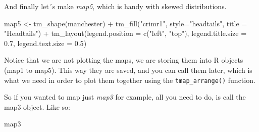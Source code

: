 \documentclass[
]{book}
\makeatletter
\newenvironment{Shaded}{\begin{snugshade}}{\end{snugshade}}
\newcommand{\AttributeTok}[1]{\textcolor[rgb]{0.61,0.61,0.61}{#1}}
\newcommand{\FloatTok}[1]{\textcolor[rgb]{0.06,0.06,0.06}{#1}}
\newcommand{\FunctionTok}[1]{\textcolor[rgb]{0,0,0}{#1}}
\newcommand{\NormalTok}[1]{#1}
\newcommand{\OtherTok}[1]{\textcolor[rgb]{0.37,0.37,0.37}{#1}}
\newcommand{\SpecialCharTok}[1]{\textcolor[rgb]{0,0,0}{#1}}
\newcommand{\StringTok}[1]{\textcolor[rgb]{0.5,0.5,0.5}{#1}}
\newenvironment{kframe}{%
\medskip{}
\setlength{\fboxsep}{.8em}
 \def\at@end@of@kframe{}%
 \ifinner\ifhmode%
  \def\at@end@of@kframe{\end{minipage}}%
  \begin{minipage}{\columnwidth}%
 \fi\fi%
 \def\FrameCommand##1{\hskip\@totalleftmargin \hskip-\fboxsep
 \colorbox{shadecolor}{##1}\hskip-\fboxsep
     \hskip-\linewidth \hskip-\@totalleftmargin \hskip\columnwidth}%
 \MakeFramed {\advance\hsize-\width
   \@totalleftmargin\z@ \linewidth\hsize
   \@setminipage}}%
 {\par\unskip\endMakeFramed%
 \at@end@of@kframe}
\renewenvironment{Shaded}{\begin{kframe}}{\end{kframe}}
\makeatother
\begin{document}
And finally let´s make \emph{map5}, which is handy with skewed distributions.

\begin{Shaded}
\begin{Highlighting}[]
\NormalTok{map5 }\OtherTok{\textless{}{-}} \FunctionTok{tm\_shape}\NormalTok{(manchester) }\SpecialCharTok{+} 
  \FunctionTok{tm\_fill}\NormalTok{(}\StringTok{"crimr1"}\NormalTok{, }\AttributeTok{style=}\StringTok{"headtails"}\NormalTok{, }\AttributeTok{title =} \StringTok{"Headtails"}\NormalTok{) }\SpecialCharTok{+}
  \FunctionTok{tm\_layout}\NormalTok{(}\AttributeTok{legend.position =} \FunctionTok{c}\NormalTok{(}\StringTok{"left"}\NormalTok{, }\StringTok{"top"}\NormalTok{), }
            \AttributeTok{legend.title.size =} \FloatTok{0.7}\NormalTok{,}
            \AttributeTok{legend.text.size =} \FloatTok{0.5}\NormalTok{)}
\end{Highlighting}
\end{Shaded}

Notice that we are not plotting the maps, we are storing them into R objects (map1 to map5). This way they are saved, and you can call them later, which is what we need in order to plot them together using the \texttt{tmap\_arrange()} function.

So if you wanted to map just \emph{map3} for example, all you need to do, is call the map3 object. Like so:

\begin{Shaded}
\begin{Highlighting}[]
\NormalTok{map3}
\end{Highlighting}
\end{Shaded}
\end{document}
